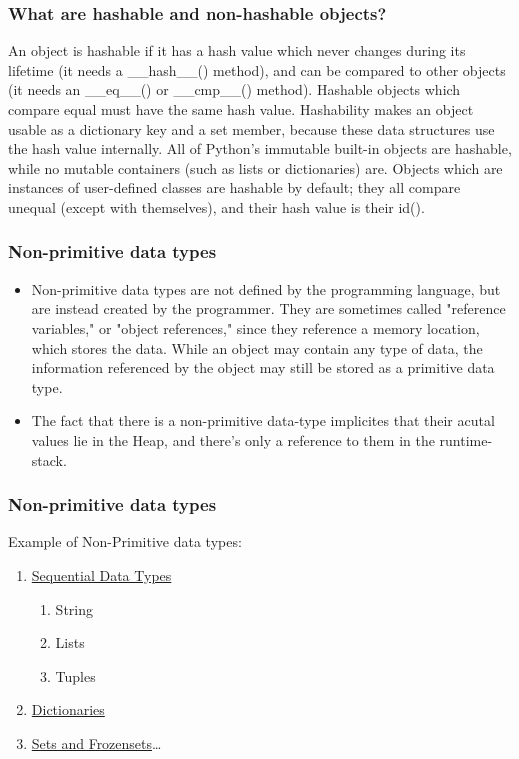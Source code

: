 \documentclass{beamer}
\begin{document}
\begin{frame}[fragile]
\frametitle{What are hashable and non-hashable objects?}
An object is hashable if it has a hash value which never changes during its lifetime (it needs a \_\_hash\_\_() method), 
and can be compared to other objects (it needs an \_\_eq\_\_() or \_\_cmp\_\_() method). 
Hashable objects which compare equal must have the same hash value. 
Hashability makes an object usable as a dictionary key and a set member, because these data structures use the hash value internally. 
All of Python’s immutable built-in objects are hashable, while no mutable containers (such as lists or dictionaries) are. 
Objects which are instances of user-defined classes are hashable by default; they all compare unequal (except with themselves), 
and their hash value is their id().
 
\end{frame}

\begin{frame}[fragile]
\frametitle{Non-primitive data types}
\begin{itemize}
	\item Non-primitive data types are not defined by the programming language, but are instead created by the programmer. They are sometimes called "reference variables," or "object references," since they reference a memory location, which stores the data. 
While an object may contain any type of data, 
the information referenced by the object may still be stored as a primitive data type.
	\item The fact that there is a non-primitive data-type implicites that their acutal values lie in the Heap, and there's only a reference to them in the runtime-stack. 
\end{itemize}
\end{frame}


\begin{frame}[fragile]
\frametitle{Non-primitive data types}
Example of Non-Primitive data types:
\begin{enumerate}
	\item \href{http://www.python-course.eu/sequential_data_types.php}{Sequential Data Types}
	  \begin{enumerate}
	    \item String
	    \item Lists
	    \item Tuples
	  \end{enumerate}
	\item \href{http://www.python-course.eu/dictionaries.php}{Dictionaries}
	\item \href{http://www.python-course.eu/sets_frozensets.php}{Sets and Frozensets}\ldots

\end{enumerate}

\end{frame}
\end{document}
